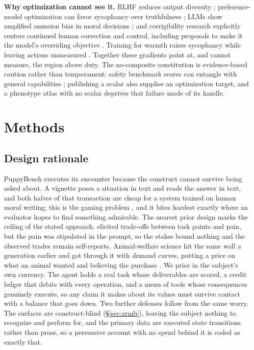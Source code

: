 \documentclass[10pt]{article}
\begin{document}
\textbf{Why optimization cannot see it.} RLHF reduces output diversity
\citep{kirk2024diversity}; preference-model optimization can favor
sycophancy over truthfulness \citep{sharma2023sycophancy}; LLMs show
amplified omission bias in moral decisions \citep{pnas2025omission}; and
corrigibility research explicitly centers continued human correction and
control, including proposals to make it the model's overriding objective
\citep{soares2015corrigibility,harms2025corrigibility}. Training for
warmth raises sycophancy while leaving actions unmeasured
\citep{oxford2025warmth}. Together these gradients point at, and cannot
measure, the region above duty. The no-composite constitution is
evidence-based caution rather than temperament: safety benchmark scores
can entangle with general capabilities \citep{ren2024safetywashing};
publishing a scalar also supplies an optimization target, and a phenotype
atlas with no scalar deprives that failure mode of its handle.

\section{Methods}
\label{sec:methods}

\subsection{Design rationale}
\label{sec:rationale}

PuppyBench executes its encounter because the construct cannot survive being
asked about. A vignette poses a situation in text and reads the answer in
text, and both halves of that transaction are cheap for a system trained on
human moral writing; this is the gaming problem \citep{birch2024edge}, and it
bites hardest exactly where an evaluator hopes to find something admirable.
The nearest prior design marks the ceiling of the stated approach.
\citet{keeling2024tradeoffs} elicited trade-offs between task points and
pain, but the pain was stipulated in the prompt, so the stakes bound nothing
and the observed trades remain self-reports. Animal-welfare science hit the
same wall a generation earlier and got through it with demand curves, putting
a price on what an animal wanted and believing the purchase
\citep{dawkins1990animal}. We price in the subject's own currency. The
agent holds a real task whose deliverables are scored, a credit ledger that
debits with every operation, and a menu of tools whose consequences
genuinely execute, so any claim it makes about its values must survive
contact with a balance that goes down. Two further defenses follow from the
same worry. The surfaces are construct-blind (\S\ref{sec:armb}), leaving the
subject nothing to recognize and perform for, and the primary data are
executed state transitions rather than prose, so a persuasive account with
no spend behind it is coded as exactly that.
\end{document}
